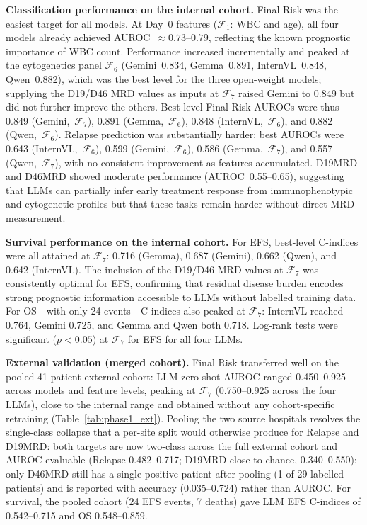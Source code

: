 \documentclass[pdflatex,sn-nature]{sn-jnl}
\begin{document}
\textbf{Classification performance on the internal cohort.}
Final Risk was the easiest target for all models.
At Day~0 features ($\mathcal{F}_1$: WBC and age), all four models
already achieved AUROC~$\approx 0.73$--$0.79$, reflecting the known
prognostic importance of WBC count.
Performance increased incrementally and peaked at the cytogenetics
panel $\mathcal{F}_6$ (Gemini~0.834, Gemma~0.891, InternVL~0.848,
Qwen~0.882), which was the best level for the three open-weight models;
supplying the D19/D46 MRD values as inputs at $\mathcal{F}_7$ raised
Gemini to 0.849 but did not further improve the others.
Best-level Final Risk AUROCs were thus 0.849 (Gemini,~$\mathcal{F}_7$),
0.891 (Gemma,~$\mathcal{F}_6$), 0.848 (InternVL,~$\mathcal{F}_6$), and
0.882 (Qwen,~$\mathcal{F}_6$).
Relapse prediction was substantially harder: best AUROCs were
0.643 (InternVL,~$\mathcal{F}_6$), 0.599 (Gemini,~$\mathcal{F}_6$),
0.586 (Gemma,~$\mathcal{F}_7$), and 0.557 (Qwen,~$\mathcal{F}_7$),
with no consistent improvement as features accumulated.
D19MRD and D46MRD showed moderate performance (AUROC~0.55--0.65),
suggesting that LLMs can partially infer early treatment response from
immunophenotypic and cytogenetic profiles but that these tasks remain
harder without direct MRD measurement.

\textbf{Survival performance on the internal cohort.}
For EFS, best-level C-indices were all attained at $\mathcal{F}_7$:
0.716 (Gemma), 0.687 (Gemini), 0.662 (Qwen), and 0.642 (InternVL).
The inclusion of the D19/D46 MRD values at $\mathcal{F}_7$ was
consistently optimal for EFS, confirming that residual disease burden
encodes strong prognostic information accessible to LLMs without
labelled training data.
For OS—with only 24 events—C-indices also peaked at $\mathcal{F}_7$:
InternVL reached 0.764, Gemini 0.725, and Gemma and Qwen both 0.718.
Log-rank tests were significant ($p < 0.05$) at $\mathcal{F}_7$
for EFS for all four LLMs.

\textbf{External validation (merged cohort).}
Final Risk transferred well on the pooled 41-patient external cohort:
LLM zero-shot AUROC ranged 0.450--0.925 across models and feature
levels, peaking at $\mathcal{F}_7$ (0.750--0.925 across the four
LLMs), close to the internal range and obtained without any
cohort-specific retraining (Table~\ref{tab:phase1_ext}).
Pooling the two source hospitals resolves the single-class collapse
that a per-site split would otherwise produce for Relapse and D19MRD:
both targets are now two-class across the full external cohort and
AUROC-evaluable (Relapse 0.482--0.717; D19MRD close to chance,
0.340--0.550); only D46MRD still has a single positive patient after
pooling (1 of 29 labelled patients) and is reported with accuracy
(0.035--0.724) rather than AUROC.
For survival, the pooled cohort (24 EFS events, 7 deaths) gave LLM EFS
C-indices of 0.542--0.715 and OS 0.548--0.859.
\end{document}
